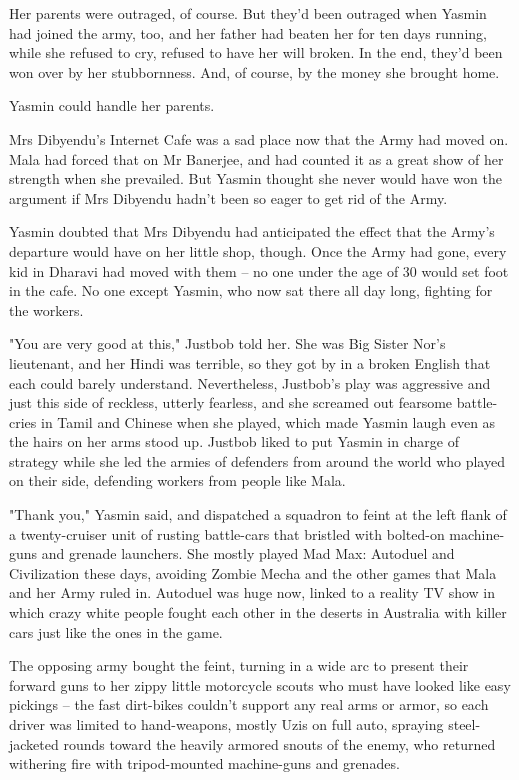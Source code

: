 Her parents were outraged, of course. But they'd been outraged when
Yasmin had joined the army, too, and her father had beaten her for
ten days running, while she refused to cry, refused to have her
will broken. In the end, they'd been won over by her stubbornness.
And, of course, by the money she brought home.

Yasmin could handle her parents.

Mrs Dibyendu's Internet Cafe was a sad place now that the Army had
moved on. Mala had forced that on Mr Banerjee, and had counted it
as a great show of her strength when she prevailed. But Yasmin
thought she never would have won the argument if Mrs Dibyendu
hadn't been so eager to get rid of the Army.

Yasmin doubted that Mrs Dibyendu had anticipated the effect that
the Army's departure would have on her little shop, though. Once
the Army had gone, every kid in Dharavi had moved with them -- no
one under the age of 30 would set foot in the cafe. No one except
Yasmin, who now sat there all day long, fighting for the workers.

"You are very good at this," Justbob told her. She was Big Sister
Nor's lieutenant, and her Hindi was terrible, so they got by in a
broken English that each could barely understand. Nevertheless,
Justbob's play was aggressive and just this side of reckless,
utterly fearless, and she screamed out fearsome battle-cries in
Tamil and Chinese when she played, which made Yasmin laugh even as
the hairs on her arms stood up. Justbob liked to put Yasmin in
charge of strategy while she led the armies of defenders from
around the world who played on their side, defending workers from
people like Mala.

"Thank you," Yasmin said, and dispatched a squadron to feint at the
left flank of a twenty-cruiser unit of rusting battle-cars that
bristled with bolted-on machine-guns and grenade launchers. She
mostly played Mad Max: Autoduel and Civilization these days,
avoiding Zombie Mecha and the other games that Mala and her Army
ruled in. Autoduel was huge now, linked to a reality TV show in
which crazy white people fought each other in the deserts in
Australia with killer cars just like the ones in the game.

The opposing army bought the feint, turning in a wide arc to
present their forward guns to her zippy little motorcycle scouts
who must have looked like easy pickings -- the fast dirt-bikes
couldn't support any real arms or armor, so each driver was limited
to hand-weapons, mostly Uzis on full auto, spraying steel-jacketed
rounds toward the heavily armored snouts of the enemy, who returned
withering fire with tripod-mounted machine-guns and grenades.

